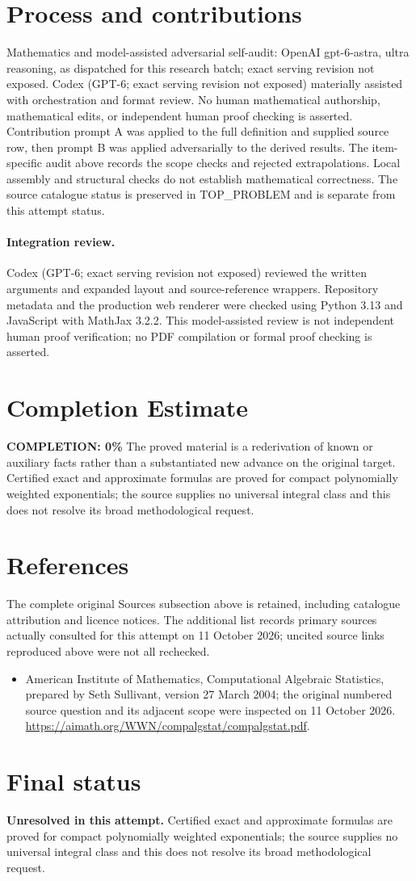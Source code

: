 \documentclass[11pt]{article}
\begin{document}
\section{Process and contributions}
Mathematics and model-assisted adversarial self-audit: OpenAI gpt-6-astra, ultra reasoning, as dispatched for this research batch; exact serving revision not exposed. Codex (GPT-6; exact serving revision not exposed) materially assisted with orchestration and format review. No human mathematical authorship, mathematical edits, or independent human proof checking is asserted.
Contribution prompt A was applied to the full definition and supplied source row, then prompt B was applied adversarially to the derived results. The item-specific audit above records the scope checks and rejected extrapolations. Local assembly and structural checks do not establish mathematical correctness. The source catalogue status is preserved in TOP\_PROBLEM and is separate from this attempt status.
\paragraph{Integration review.} Codex (GPT-6; exact serving revision not exposed) reviewed the written arguments and expanded layout and source-reference wrappers. Repository metadata and the production web renderer were checked using Python 3.13 and JavaScript with MathJax 3.2.2. This model-assisted review is not independent human proof verification; no PDF compilation or formal proof checking is asserted.

\section{Completion Estimate}
\noindent\textbf{COMPLETION: 0\%}
The proved material is a rederivation of known or auxiliary facts rather than a substantiated new advance on the original target. Certified exact and approximate formulas are proved for compact polynomially weighted exponentials; the source supplies no universal integral class and this does not resolve its broad methodological request.
\section{References}
The complete original Sources subsection above is retained, including catalogue attribution and licence notices. The additional list records primary sources actually consulted for this attempt on 11 October 2026; uncited source links reproduced above were not all rechecked.
\begin{itemize}
\item American Institute of Mathematics, Computational Algebraic Statistics, prepared by Seth Sullivant, version 27 March 2004; the original numbered source question and its adjacent scope were inspected on 11 October 2026. \url{https://aimath.org/WWN/compalgstat/compalgstat.pdf}.
\end{itemize}
\section{Final status}
\textbf{Unresolved in this attempt.} Certified exact and approximate formulas are proved for compact polynomially weighted exponentials; the source supplies no universal integral class and this does not resolve its broad methodological request.
\end{document}
